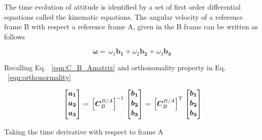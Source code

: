 The time evolution of attitude is identified by a set of first order differential equations called the kinematic equations. 
The angular velocity of a reference frame B with respect a reference frame A, given in the B frame can be written as follows

\begin{equation}\label{eqn:quaternion1}
\bm{\omega}
 =\,
\omega_1 \bm{b_1} + \omega_2 \bm{b_2} + \omega_3 \bm{b_3}
\end{equation}

Recalling Eq. ~\ref{eqn:C_B_Amatrix} and orthonomality property in Eq. ~\ref{eqn:orthonormality}

\begin{equation}{\label{eqn:kinematicsDerivation1}}
\begin{bmatrix}
\bm{a_1}\\[0.2em]
\bm{a_2}\\[0.2em]
\bm{a_3}\\[0.2em]
\end{bmatrix}
=\,
\Big[{\bm{C}_B^{B/A}}\Big]^{-1}
\,
\begin{bmatrix}
\bm{b_1}\\[0.2em]
\bm{b_2}\\[0.2em]
\bm{b_3}\\[0.2em]
\end{bmatrix}
=\,
\Big[{\bm{C}_B^{B/A}}\Big]^{\rm T}
\,
\begin{bmatrix}
\bm{b_1}\\[0.2em]
\bm{b_2}\\[0.2em]
\bm{b_3}\\[0.2em]
\end{bmatrix}
\end{equation} 

Taking the time derivative with respect to frame A

